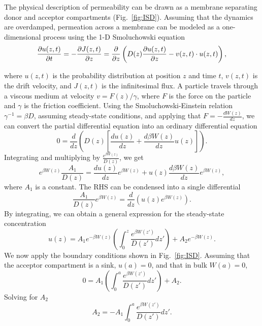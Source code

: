         \par The physical description of permeability can be drawn as a membrane separating donor and acceptor compartments (Fig.~\ref{fig:ISD}). Assuming that the dynamics are overdamped, permeation across a membrane can be modeled as a one-dimensional process using the 1-D Smoluchowski equation
        \begin{equation}
            \frac{\partial u(z,t)}{\partial t} = -\frac{\partial J(z,t)}{\partial z} = \frac{\partial}{\partial z}\left(D(z)\frac{\partial u(z,t)}{\partial z} - v(z,t)\cdot u(z,t)\right),
            \label{eq:smoluchowski}
        \end{equation}

        where $u(z,t)$ is the probability distribution at position $z$ and time $t$, $v(z,t)$ is the drift velocity, and $J(z,t)$ is the infinitesimal flux. A particle travels through a viscous medium at velocity $v = F(z)/\gamma$, where $F$ is the force on the particle and $\gamma$ is the friction coefficient. Using the Smoluchowski-Einstein relation $\gamma^{-1} = \beta D$, assuming steady-state conditions, and applying that $F = -\frac{dW(z)}{dz}$, we can convert the partial differential equation into an ordinary differential equation
        \begin{equation}
            0 = \frac{d}{dz} \left(D(z) \left[\frac{du(z)}{dz} + \frac{d \beta W(z)}{dz}u(z)\right]\right).
        \end{equation}
        Integrating and multiplying by $\frac{e^{\beta W(z)}}{D(z)}$, we get
        \begin{equation}
            e^{\beta W(z)} \frac{A_1}{D(z)} = \frac{du(z)}{dz} e^{\beta W(z)} + u(z)\frac{d\beta W(z)}{dz} e^{\beta W(z)},
            \label{eq:a1dz}
        \end{equation}
        where $A_1$ is a constant. The RHS can be condensed into a single differential
        \begin{equation}
            \frac{A_1}{D(z)} e^{\beta W(z)} = \frac{d}{dz}\left(u(z)e^{\beta W(z)}\right).
        \end{equation}
        By integrating, we can obtain a general expression for the steady-state concentration
        \begin{equation}
            u(z) = A_1e^{-\beta W(z)}\left(\int_0^z \frac{e^{\beta W(z')}}{D(z')}dz' \right) + A_2e^{-\beta W(z)}.
            \label{eq:uz}
        \end{equation}
        We now apply the boundary conditions shown in Fig.~\ref{fig:ISD}. Assuming that the acceptor compartment is a sink, $u(a) = 0$, and that in bulk $W(a) = 0$,
        \begin{equation}
            0 = A_1\left(\int_{0}^{a}\frac{e^{\beta W(z')}}{D(z')}dz'\right) + A_2.
        \end{equation}
        Solving for $A_2$
        \begin{equation}
            A_2 = -A_1\int_{0}^{a}\frac{e^{\beta W(z')}}{D(z')}dz'.
            \label{eq:a2}
        \end{equation}

